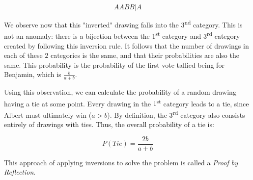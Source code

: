 \documentclass{article}
\begin{document}
$$AABB|A$$

We observe now that this "inverted" drawing falls into the 
$3$\textsuperscript{nd} category. This is not an 
anomaly: there is a bijection between the $1$\textsuperscript{st} category
and $3$\textsuperscript{rd} category created by following this inversion 
rule. It follows that the number of drawings in each of these $2$ 
categories is the same, and that their probabilities are also 
the same. This probability is the probability of the first vote 
tallied being for Benjamin, which is $\frac{b}{a+b}$.

Using this observation, we can calculate the probability of 
a random drawing having a tie at some point. Every drawing in the 
$1$\textsuperscript{st} category leads to a tie, since Albert 
must ultimately win ($a > b$). By definition, the
$3$\textsuperscript{rd} category also consists entirely of 
drawings with ties. Thus, the overall probability of a tie is:

$$P(Tie) = \frac{2b}{a+b}$$

This approach of applying inversions to solve the problem is 
called a \textit{Proof by Reflection}.
\end{document}
